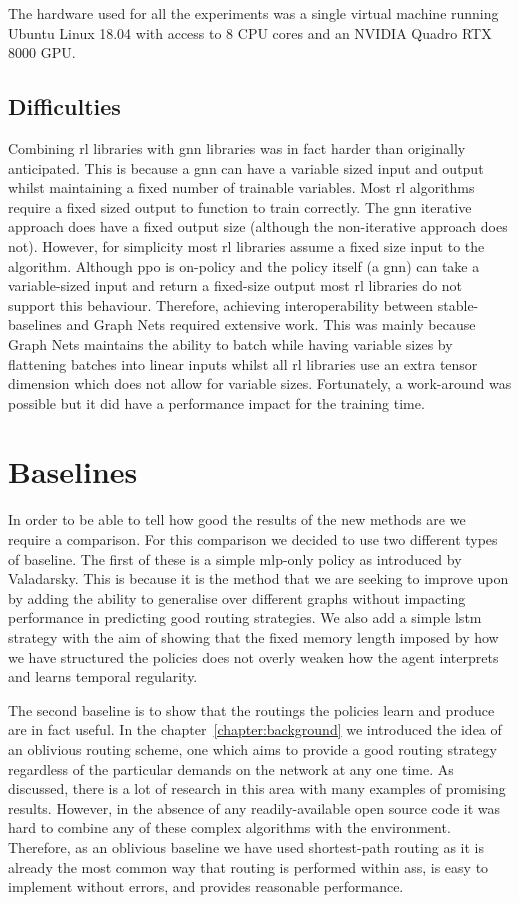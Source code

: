 The hardware used for all the experiments was a single virtual machine running Ubuntu Linux 18.04 with access to 8 CPU cores and an NVIDIA Quadro RTX 8000 GPU.


\subsection{Difficulties}
Combining \ac{rl} libraries with \ac{gnn} libraries was in fact harder than originally anticipated. This is because a \ac{gnn} can have a variable sized input and output whilst maintaining a fixed number of trainable variables. Most \ac{rl} algorithms require a fixed sized output to function to train correctly. The \ac{gnn} iterative approach does have a fixed output size (although the non-iterative approach does not). However, for simplicity most \ac{rl} libraries assume a fixed size input to the algorithm. Although \ac{ppo} is on-policy and the policy itself (a \ac{gnn}) can take a variable-sized input and return a fixed-size output most \ac{rl} libraries do not support this behaviour. Therefore, achieving interoperability between stable-baselines and Graph Nets required extensive work. This was mainly because Graph Nets maintains the ability to batch while having variable sizes by flattening batches into linear inputs whilst all \ac{rl} libraries use an extra tensor dimension which does not allow for variable sizes. Fortunately, a work-around was possible but it did have a performance impact for the training time.


\section{Baselines}
In order to be able to tell how good the results of the new methods are we require a comparison. For this comparison we decided to use two different types of baseline. The first of these is a simple \ac{mlp}-only policy as introduced by Valadarsky. This is because it is the method that we are seeking to improve upon by adding the ability to generalise over different graphs without impacting performance in predicting good routing strategies. We also add a simple \ac{lstm} strategy with the aim of showing that the fixed memory length imposed by how we have structured the policies does not overly weaken how the agent interprets and learns temporal regularity.

The second baseline is to show that the routings the policies learn and produce are in fact useful. In the chapter~\ref{chapter:background} we introduced the idea of an oblivious routing scheme, one which aims to provide a good routing strategy regardless of the particular demands on the network at any one time. As discussed, there is a lot of research in this area with many examples of promising results. However, in the absence of any readily-available open source code it was hard to combine any of these complex algorithms with the environment. Therefore, as an oblivious baseline we have used shortest-path routing as it is already the most common way that routing is performed within \acp{as}, is easy to implement without errors, and provides reasonable performance.

